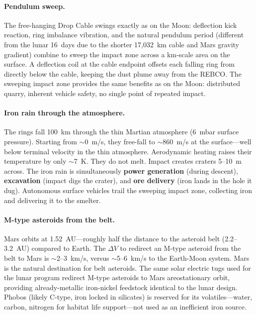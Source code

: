 \documentclass[12pt,letterpaper]{article}
\begin{document}
\paragraph{Pendulum sweep.}
The free-hanging Drop Cable swings exactly as on the Moon: deflection kick reaction, ring imbalance vibration, and the natural pendulum period (different from the lunar 16~days due to the shorter 17{,}032~km cable and Mars gravity gradient) combine to sweep the impact zone across a km-scale area on the surface. A deflection coil at the cable endpoint offsets each falling ring from directly below the cable, keeping the dust plume away from the REBCO. The sweeping impact zone provides the same benefits as on the Moon: distributed quarry, inherent vehicle safety, no single point of repeated impact.

\paragraph{Iron rain through the atmosphere.}
The rings fall 100~km through the thin Martian atmosphere (6~mbar surface pressure). Starting from ${\sim}$0~m/s, they free-fall to ${\sim}$860~m/s at the surface---well below terminal velocity in the thin atmosphere. Aerodynamic heating raises their temperature by only ${\sim}$7~K. They do not melt. Impact creates craters 5--10~m across. The iron rain is simultaneously \textbf{power generation} (during descent), \textbf{excavation} (impact digs the crater), and \textbf{ore delivery} (iron lands in the hole it dug). Autonomous surface vehicles trail the sweeping impact zone, collecting iron and delivering it to the smelter.

\paragraph{M-type asteroids from the belt.}
Mars orbits at 1.52~AU---roughly half the distance to the asteroid belt (2.2--3.2~AU) compared to Earth. The $\Delta V$ to redirect an M-type asteroid from the belt to Mars is ${\sim}$2--3~km/s, versus ${\sim}$5--6~km/s to the Earth-Moon system. Mars is the natural destination for belt asteroids. The same solar electric tugs used for the lunar program redirect M-type asteroids to Mars areostationary orbit, providing already-metallic iron-nickel feedstock identical to the lunar design. Phobos (likely C-type, iron locked in silicates) is reserved for its volatiles---water, carbon, nitrogen for habitat life support---not used as an inefficient iron source.
\end{document}

